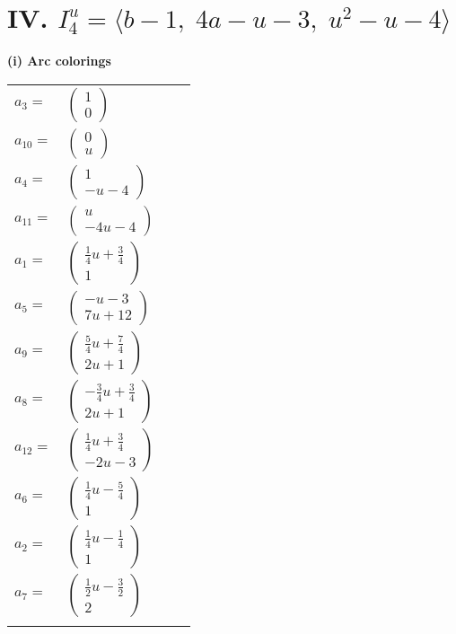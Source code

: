 \documentclass[1p]{elsarticle_modified}
\theoremstyle{definition}
\begin{document}
\centering \section*{IV. $I^u_{4}= \langle b-1,\;4 a- u-3,\;u^2- u-4 \rangle$}
\flushleft \textbf{(i) Arc colorings}\\
\begin{tabular}{m{7pt} m{180pt} m{7pt} m{180pt} }
\flushright $a_{3}=$&$\begin{pmatrix}1\\0\end{pmatrix}$ \\
\flushright $a_{10}=$&$\begin{pmatrix}0\\u\end{pmatrix}$ \\
\flushright $a_{4}=$&$\begin{pmatrix}1\\- u-4\end{pmatrix}$ \\
\flushright $a_{11}=$&$\begin{pmatrix}u\\-4 u-4\end{pmatrix}$ \\
\flushright $a_{1}=$&$\begin{pmatrix}\frac{1}{4} u+\frac{3}{4}\\1\end{pmatrix}$ \\
\flushright $a_{5}=$&$\begin{pmatrix}- u-3\\7 u+12\end{pmatrix}$ \\
\flushright $a_{9}=$&$\begin{pmatrix}\frac{5}{4} u+\frac{7}{4}\\2 u+1\end{pmatrix}$ \\
\flushright $a_{8}=$&$\begin{pmatrix}-\frac{3}{4} u+\frac{3}{4}\\2 u+1\end{pmatrix}$ \\
\flushright $a_{12}=$&$\begin{pmatrix}\frac{1}{4} u+\frac{3}{4}\\-2 u-3\end{pmatrix}$ \\
\flushright $a_{6}=$&$\begin{pmatrix}\frac{1}{4} u-\frac{5}{4}\\1\end{pmatrix}$ \\
\flushright $a_{2}=$&$\begin{pmatrix}\frac{1}{4} u-\frac{1}{4}\\1\end{pmatrix}$ \\
\flushright $a_{7}=$&$\begin{pmatrix}\frac{1}{2} u-\frac{3}{2}\\2\end{pmatrix}$\\&\end{tabular}
\end{document}
